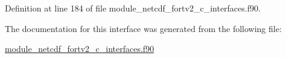 Definition at line 184 of file module\+\_\+netcdf\+\_\+fortv2\+\_\+c\+\_\+interfaces.\+f90.



The documentation for this interface was generated from the following file\+:\begin{DoxyCompactItemize}
\item 
\hyperlink{module__netcdf__fortv2__c__interfaces_8f90}{module\+\_\+netcdf\+\_\+fortv2\+\_\+c\+\_\+interfaces.\+f90}\end{DoxyCompactItemize}
